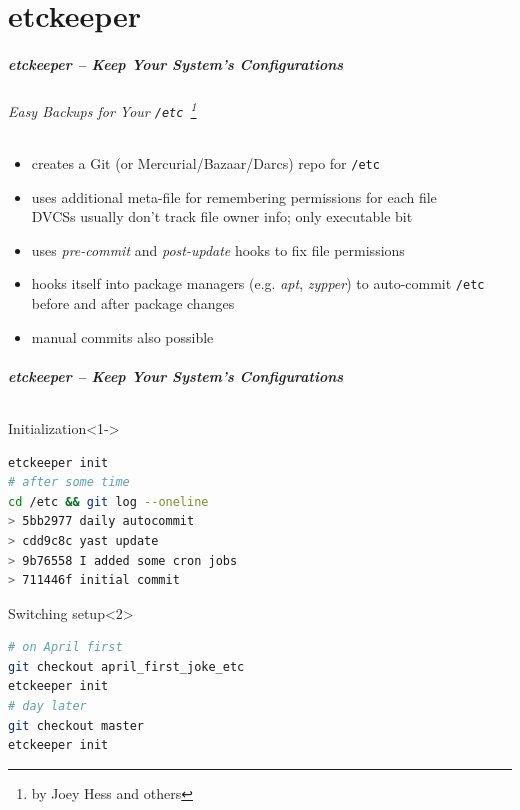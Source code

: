 \documentclass[english,hyperref={pdfpagelabels=false},aspectratio=1610]{beamer}
\begin{document}
\part{etckeeper}
\makepart

\begin{frame}[label=etckeeper]
  \frametitle{etckeeper -- Keep Your System's Configurations}
  \framesubtitle{Easy Backups for Your \texttt{/etc}~\footnote{\tiny by Joey Hess and others}}
  \begin{itemize}
    \item creates a Git {\scriptsize\color{fzjgray50}(or Mercurial/Bazaar/Darcs)} repo for \texttt{/etc}
    \item uses additional meta-file for remembering permissions for each file\\
      {\scriptsize DVCSs usually don't track file owner info; only executable bit}
    \item uses \textit{pre-commit} and \textit{post-update} hooks to fix file permissions
    \item hooks itself into package managers {\scriptsize\color{fzjgray50}(e.g. \textit{apt}, \textit{zypper})} to auto-commit \texttt{/etc} \\
      before and after package changes
    \item manual commits also possible
  \end{itemize}
\end{frame}

\begin{frame}[fragile]
  \frametitle{etckeeper -- Keep Your System's Configurations}
  \framesubtitle{}
  \begin{block}{Initialization}<1->
    \vspace{-0.75em}
    \begin{lstlisting}[language=zsh]
etckeeper init
# after some time
cd /etc && git log --oneline
> 5bb2977 daily autocommit
> cdd9c8c yast update
> 9b76558 I added some cron jobs
> 711446f initial commit
    \end{lstlisting}
    \vspace{-0.75em}
  \end{block}
  \begin{block}{Switching setup}<2>
    \vspace{-0.75em}
    \begin{lstlisting}[language=zsh]
# on April first
git checkout april_first_joke_etc
etckeeper init
# day later
git checkout master
etckeeper init
    \end{lstlisting}
    \vspace{-0.75em}
  \end{block}
\end{frame}
\end{document}
